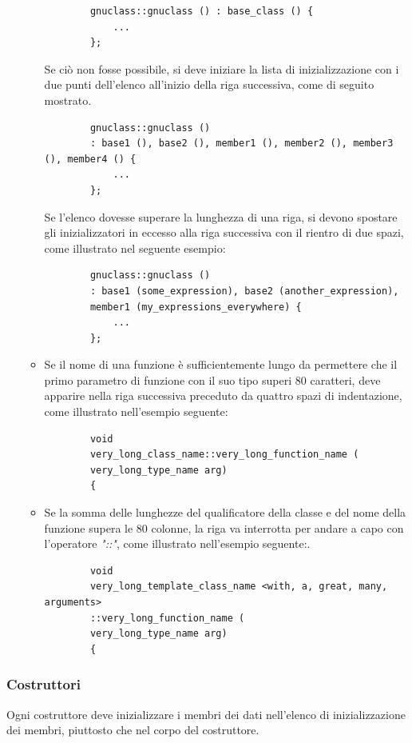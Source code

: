 \documentclass[../NomeDocumento.tex]{subfiles}
\begin{document}
\begin{itemize}
\begin{itemize}
		\begin{verbatim}
		gnuclass::gnuclass () : base_class () { 
			...
		};
		\end{verbatim}
		
		Se ciò non fosse possibile, si deve iniziare la lista di inizializzazione con i due punti dell'elenco all'inizio della riga successiva, come di seguito mostrato.
		
		\begin{verbatim}
		gnuclass::gnuclass ()
		: base1 (), base2 (), member1 (), member2 (), member3 (), member4 () { 
			...
		};
		\end{verbatim}
		
		Se l'elenco dovesse superare la lunghezza di una riga, si devono spostare gli inizializzatori in eccesso alla riga successiva con il rientro di due spazi, come illustrato nel seguente esempio:
		
		\begin{verbatim}
		gnuclass::gnuclass ()
		: base1 (some_expression), base2 (another_expression),
		member1 (my_expressions_everywhere) { 
			...
		};
		\end{verbatim}
		
		\item Se il nome di una funzione è sufficientemente lungo da permettere che il primo parametro di funzione con il suo tipo superi 80 caratteri, deve apparire nella riga successiva preceduto da quattro spazi di indentazione, come illustrato nell'esempio seguente:
		
		\begin{verbatim}
		void
		very_long_class_name::very_long_function_name (
		very_long_type_name arg)
		{
		\end{verbatim}
		
		\item Se la somma delle lunghezze del qualificatore della classe e del nome della funzione supera le 80 colonne, la riga va interrotta per andare a capo con l'operatore \textit{"::"}, come illustrato nell'esempio seguente:.
		
		\begin{verbatim}
		void
		very_long_template_class_name <with, a, great, many, arguments>
		::very_long_function_name (
		very_long_type_name arg)
		{
		\end{verbatim}		
	\end{itemize}
	
	\end{itemize}
	
	\subsubsection*{Costruttori} 
	Ogni costruttore deve inizializzare i membri dei dati nell'elenco di inizializzazione dei membri, piuttosto che nel corpo del costruttore.
		
\end{document}
